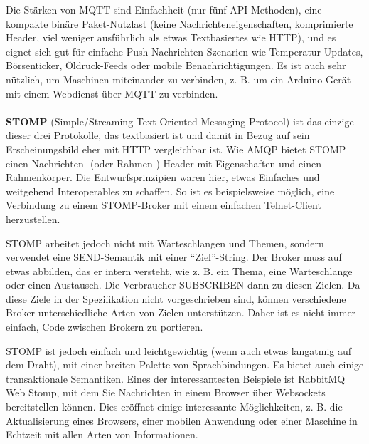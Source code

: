 \documentclass[../vs-script-first-v01.tex]{subfiles}
\begin{document}
Die Stärken von MQTT sind Einfachheit (nur fünf API-Methoden), eine kompakte binäre Paket-Nutzlast (keine Nachrichteneigenschaften, komprimierte Header, viel weniger ausführlich als etwas Textbasiertes wie HTTP), und es eignet sich gut für einfache Push-Nachrichten-Szenarien wie Temperatur-Updates, Börsenticker, Öldruck-Feeds oder mobile Benachrichtigungen. Es ist auch sehr nützlich, um Maschinen miteinander zu verbinden, z. B. um ein Arduino-Gerät mit einem Webdienst über MQTT zu verbinden.
\\\\
\textbf{STOMP} (Simple/Streaming Text Oriented Messaging Protocol) ist das einzige dieser drei Protokolle, das textbasiert ist und damit in Bezug auf sein Erscheinungsbild eher mit HTTP vergleichbar ist. Wie AMQP bietet STOMP einen Nachrichten- (oder Rahmen-) Header mit Eigenschaften und einen Rahmenkörper. Die Entwurfsprinzipien waren hier, etwas Einfaches und weitgehend Interoperables zu schaffen. So ist es beispielsweise möglich, eine Verbindung zu einem STOMP-Broker mit einem einfachen Telnet-Client herzustellen.

STOMP arbeitet jedoch nicht mit Warteschlangen und Themen, sondern verwendet eine SEND-Semantik mit einer \enquote{Ziel}-String. Der Broker muss auf etwas abbilden, das er intern versteht, wie z. B. ein Thema, eine Warteschlange oder einen Austausch. Die Verbraucher SUBSCRIBEN dann zu diesen Zielen. Da diese Ziele in der Spezifikation nicht vorgeschrieben sind, können verschiedene Broker unterschiedliche Arten von Zielen unterstützen. Daher ist es nicht immer einfach, Code zwischen Brokern zu portieren.

STOMP ist jedoch einfach und leichtgewichtig (wenn auch etwas langatmig auf dem Draht), mit einer breiten Palette von Sprachbindungen. Es bietet auch einige transaktionale Semantiken. Eines der interessantesten Beispiele ist RabbitMQ Web Stomp, mit dem Sie Nachrichten in einem Browser über Websockets bereitstellen können. Dies eröffnet einige interessante Möglichkeiten, z. B. die Aktualisierung eines Browsers, einer mobilen Anwendung oder einer Maschine in Echtzeit mit allen Arten von Informationen.
\end{document}
